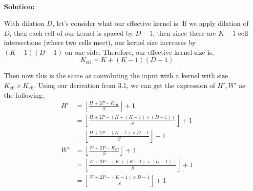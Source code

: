 \documentclass{article}
\newenvironment{solution}
  {\par\noindent\textbf{Solution:}\par}
  {\par}
\begin{document}
\subsection{}
\begin{solution}
  With dilation $D$, let's consider what our effective kernel is. If we apply dilation of $D$, then each cell of our kernel is spaced by 
  $D-1$, then since there are $K-1$ cell intersections (where two cells meet), our kernel size increases by $(K-1)(D-1)$ on one side. 
  Therefore, our effective kernel size is, 
  \[ K_\text{eff} = K + (K-1)(D-1) \]

  Then now this is the same as convoluting the input with a kernel with size $ K_\text{eff} \times K_\text{eff}$. Using our derivation from 3.1, we can get the expression of $H',W'$ as the following,
  \[
    \begin{aligned}
H' &= \left\lfloor  \frac{H+2P-K_{\text{eff}}}{S}  \right\rfloor +1 \\ 
&= \left\lfloor  \frac{H+2P-(K +(K-1) \times (D-1))}{S}  \right\rfloor +1 \\ 
&= \left\lfloor  \frac{H+2P -(K-1) \times D -1}{S}  \right\rfloor  + 1\\
W' &= \left\lfloor  \frac{W+2P-K_{\text{eff}}}{S}  \right\rfloor +1  \\ 
&=\left\lfloor  \frac{W +2P - (K + (K-1) \times(D -1))}{S}  \right\rfloor +1 \\ 
&= \left\lfloor   \frac{ W+2P - (K-1) \times D - 1}{S}  \right\rfloor +1
\end{aligned}
  \]
\end{solution}
\end{document}

